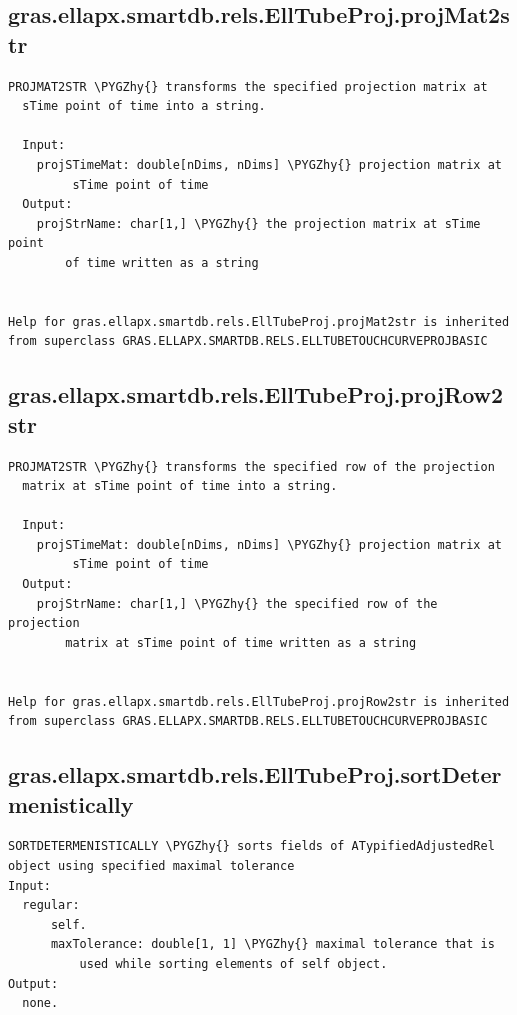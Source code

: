 \documentclass[letterpaper,10pt,english]{sphinxmanual}
\def\PYGZhy{\char`\-}
\begin{document}
\subsection{gras.ellapx.smartdb.rels.EllTubeProj.projMat2str}
\label{chap_functions:gras-ellapx-smartdb-rels-elltubeproj-projmat2str}
\begin{Verbatim}[commandchars=\\\{\}]
  PROJMAT2STR \PYGZhy{} transforms the specified projection matrix at
  sTime point of time into a string.

  Input:
    projSTimeMat: double[nDims, nDims] \PYGZhy{} projection matrix at
         sTime point of time
  Output:
    projStrName: char[1,] \PYGZhy{} the projection matrix at sTime point
        of time written as a string


Help for gras.ellapx.smartdb.rels.EllTubeProj.projMat2str is inherited from superclass GRAS.ELLAPX.SMARTDB.RELS.ELLTUBETOUCHCURVEPROJBASIC
\end{Verbatim}


\subsection{gras.ellapx.smartdb.rels.EllTubeProj.projRow2str}
\label{chap_functions:gras-ellapx-smartdb-rels-elltubeproj-projrow2str}
\begin{Verbatim}[commandchars=\\\{\}]
  PROJMAT2STR \PYGZhy{} transforms the specified row of the projection
  matrix at sTime point of time into a string.

  Input:
    projSTimeMat: double[nDims, nDims] \PYGZhy{} projection matrix at
         sTime point of time
  Output:
    projStrName: char[1,] \PYGZhy{} the specified row of the projection
        matrix at sTime point of time written as a string


Help for gras.ellapx.smartdb.rels.EllTubeProj.projRow2str is inherited from superclass GRAS.ELLAPX.SMARTDB.RELS.ELLTUBETOUCHCURVEPROJBASIC
\end{Verbatim}


\subsection{gras.ellapx.smartdb.rels.EllTubeProj.sortDetermenistically}
\label{chap_functions:gras-ellapx-smartdb-rels-elltubeproj-sortdetermenistically}
\begin{Verbatim}[commandchars=\\\{\}]
SORTDETERMENISTICALLY \PYGZhy{} sorts fields of ATypifiedAdjustedRel
object using specified maximal tolerance
Input:
  regular:
      self.
      maxTolerance: double[1, 1] \PYGZhy{} maximal tolerance that is
          used while sorting elements of self object.
Output:
  none.
\end{Verbatim}
\end{document}
